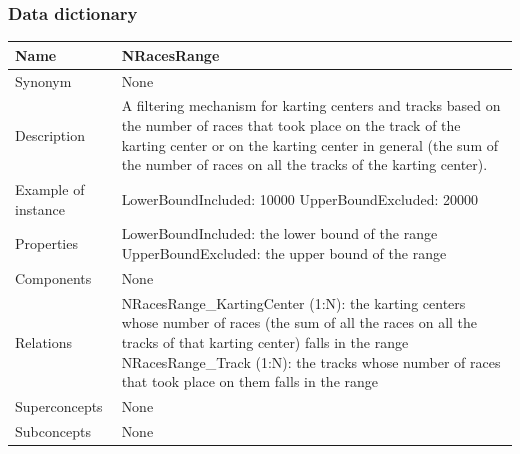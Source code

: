 \documentclass{beamer}
\begin{document}
\begin{frame}
    \frametitle{Data dictionary}
    \begin{table}
    \tiny
    \begin{tabular}{|p{2cm}|p{6cm}|}
    \hline
    Name & \textbf{NRacesRange} \\
    \hline
    Synonym & None \\
    \hline
    Description & A filtering mechanism for karting centers and tracks based on the number of
    races that took place on the track of the karting center or on the karting center 
    in general (the sum of the number of races on all the tracks of the karting center). \\
    \hline
    Example of instance &
    LowerBoundIncluded: 10000 \newline
    UpperBoundExcluded: 20000 \\
    \hline
    Properties &
    LowerBoundIncluded: the lower bound of the range \newline
    UpperBoundExcluded: the upper bound of the range \\
    \hline
    Components & None \\
    \hline
    Relations &
    NRacesRange\_KartingCenter (1:N): the karting centers whose number of races 
    (the sum of all the races on all the tracks of that karting center) falls in the range \newline
    NRacesRange\_Track (1:N): the tracks whose number of races that took place on them falls in the range \\
    \hline
    Superconcepts & None \\
    \hline
    Subconcepts & None \\
    \hline
    \end{tabular}
    \end{table}
\end{frame}
\end{document}

